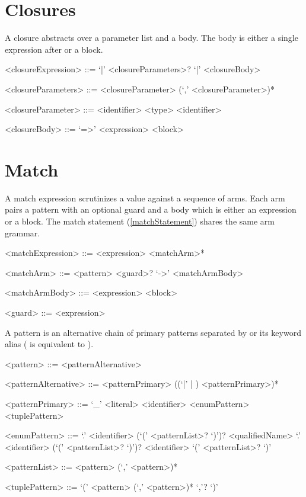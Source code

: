 \documentclass[makeidx]{article}
\begin{document}
\section{Closures}

\LMHash{}%
A closure abstracts over a parameter list and a body.
The body is either a single expression after \code{=>}
or a block.

\begin{grammar}
<closureExpression> ::= `|' <closureParameters>? `|' <closureBody>

<closureParameters> ::= <closureParameter> (`,' <closureParameter>)*

<closureParameter> ::= <identifier>
  \alt <type> <identifier>

<closureBody> ::= `=>' <expression>
  \alt <block>
\end{grammar}

\section{Match}

\LMHash{}%
A match expression scrutinizes a value against a sequence of arms.
Each arm pairs a pattern with an optional  guard and a body
which is either an expression or a block.
The match statement (\ref{matchStatement}) shares the same arm grammar.

\begin{grammar}
<matchExpression> ::= \MATCH{} <expression> \DO{} <matchArm>* \END{}

<matchArm> ::= <pattern> <guard>? `->' <matchArmBody>

<matchArmBody> ::= <expression>
  \alt <block>

<guard> ::= \IF{} <expression>
\end{grammar}

\LMHash{}%
A pattern is an alternative chain of primary patterns separated by
\code{|} or its keyword alias  ( is equivalent
to ).

\begin{grammar}
<pattern> ::= <patternAlternative>

<patternAlternative> ::= <patternPrimary> ((`|' | \OR{}) <patternPrimary>)*

<patternPrimary> ::= `_'
  \alt <literal>
  \alt <identifier>
  \alt <enumPattern>
  \alt <tuplePattern>

<enumPattern> ::= `.' <identifier> (`(' <patternList>? `)')?
  \alt <qualifiedName> `.' <identifier> (`(' <patternList>? `)')?
  \alt <identifier> `(' <patternList>? `)'

<patternList> ::= <pattern> (`,' <pattern>)*

<tuplePattern> ::= `(' <pattern> (`,' <pattern>)* `,'? `)'
\end{grammar}
\end{document}

